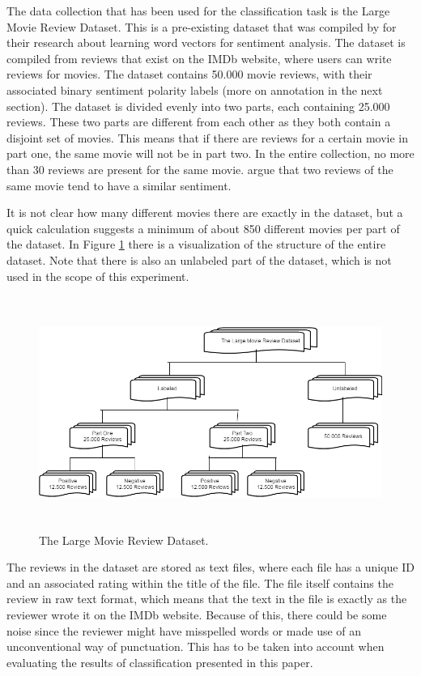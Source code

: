 \documentclass[
10pt, %
a4paper, %
oneside, %
headinclude,footinclude, %
] {book}%
\begin{document}
The data collection that has been used for the classification task is the Large Movie Review Dataset. This is a pre-existing dataset that was compiled by \citet{maas2011learning} for their research about learning word vectors for sentiment analysis. The dataset is compiled from reviews that exist on the IMDb website, where users can write reviews for movies. The dataset contains 50.000 movie reviews, with their associated binary sentiment polarity labels (more on annotation in the next section). The dataset is divided evenly into two parts, each containing 25.000 reviews. These two parts are different from each other as they both contain a disjoint set of movies. This means that if there are reviews for a certain movie in part one, the same movie will not be in part two. In the entire collection, no more than 30 reviews are present for the same movie. \citet{maas2011learning} argue that two reviews of the same movie tend to have a similar sentiment. 

It is not clear how many different movies there are exactly in the dataset, but a quick calculation suggests a minimum of about 850 different movies per part of the dataset. In Figure \ref{Figure 1} there is a visualization of the structure of the entire dataset. Note that there is also an unlabeled part of the dataset, which is not used in the scope of this experiment.

\begin{figure}[hbtp]\centering
\includegraphics[width=5in, height=3in]{dataset} 
\caption{The Large Movie Review Dataset.\label{Figure 1}}
\end{figure}

The reviews in the dataset are stored as text files, where each file has a unique ID and an associated rating within the title of the file. The file itself contains the review in raw text format, which means that the text in the file is exactly as the reviewer wrote it on the IMDb website. Because of this, there could be some noise since the reviewer might have misspelled words or made use of an unconventional way of punctuation. This has to be taken into account when evaluating the results of classification presented in this paper. 
\end{document}
